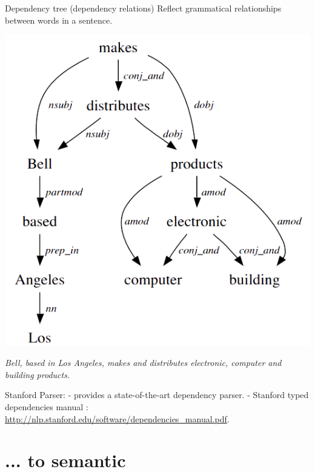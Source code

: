 \documentclass[10pt]{beamer}
\begin{document}
\begin{frame}

\begin{block}{Dependency tree (dependency relations)}
	Reflect grammatical relationships between words in a sentence.
	\begin{center}
		\includegraphics[scale=0.40]{depen.png}
			
		\textit{Bell, based in Los Angeles, makes and distributes electronic, computer and building products.}
	\end{center}
\end{block}

Stanford Parser:
	- provides a state-of-the-art dependency parser.
	- Stanford typed dependencies manual : \url{http://nlp.stanford.edu/software/dependencies_manual.pdf}.
		
\end{frame}


\section{... to semantic}
\end{document}
